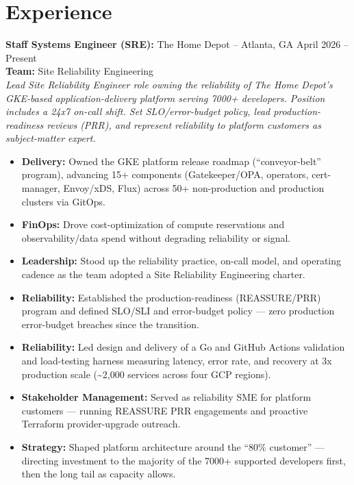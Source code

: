 \documentclass[11pt]{article}
\begin{document}
\vspace{-18.5pt}

\section*{Experience}
\begin{description}
\item\textbf{Staff Systems Engineer (SRE):} {The Home Depot} -- Atlanta, GA \hfill April 2026 -- Present \\
\textbf{Team:} Site Reliability Engineering \\
\textit{Lead Site Reliability Engineer role owning the reliability of The Home Depot's GKE-based application-delivery platform serving 7000+ developers. Position includes a 24x7 on-call shift. Set SLO/error-budget policy, lead production-readiness reviews (PRR), and represent reliability to platform customers as subject-matter expert.} \\
\vspace{-6.5pt}
\begin{itemize}
  \item \textbf{Delivery:} Owned the GKE platform release roadmap (``conveyor-belt'' program), advancing 15+ components (Gatekeeper/OPA, operators, cert-manager, Envoy/xDS, Flux) across 50+ non-production and production clusters via GitOps.
  \item \textbf{FinOps:} Drove cost-optimization of compute reservations and observability/data spend without degrading reliability or signal.
  \item \textbf{Leadership:} Stood up the reliability practice, on-call model, and operating cadence as the team adopted a Site Reliability Engineering charter.
  \item \textbf{Reliability:} Established the production-readiness (REASSURE/PRR) program and defined SLO/SLI and error-budget policy — zero production error-budget breaches since the transition.
  \item \textbf{Reliability:} Led design and delivery of a Go and GitHub Actions validation and load-testing harness measuring latency, error rate, and recovery at 3x production scale (\textasciitilde{}2,000 services across four GCP regions).
  \item \textbf{Stakeholder Management:} Served as reliability SME for platform customers — running REASSURE PRR engagements and proactive Terraform provider-upgrade outreach.
  \item \textbf{Strategy:} Shaped platform architecture around the ``80\% customer'' — directing investment to the majority of the 7000+ supported developers first, then the long tail as capacity allows.
\end{itemize}
\end{description}
\end{document}
